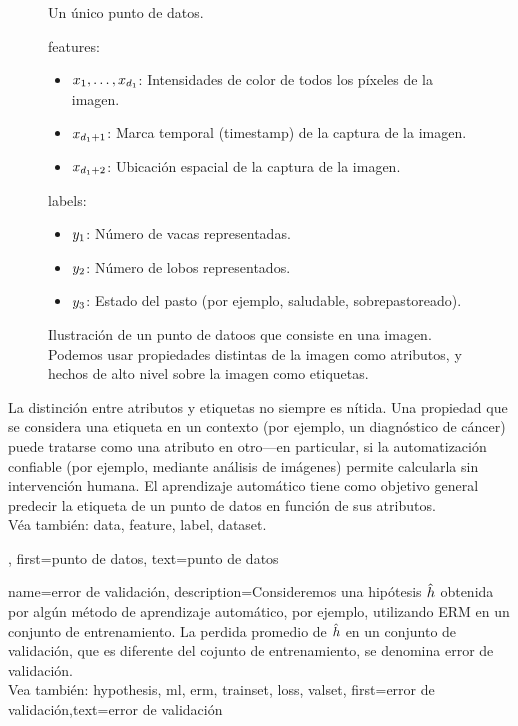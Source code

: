 {{\begin{figure}[H]
\begin{minipage}[t]{0.95\textwidth}
        			\caption*{Un único punto de datos.}
        			\vspace{5mm}
    			\end{minipage}
    			\begin{minipage}[t]{0.95\textwidth}
        			\Glspl{feature}:
        			\begin{itemize}
            			\item $x_{1},\ldots,x_{d_{1}}$: Intensidades de color de todos los píxeles de la imagen.
            			\item $x_{d_{1}+1}$: Marca temporal (timestamp) de la captura de la imagen.
            			\item $x_{d_{1}+2}$: Ubicación espacial de la captura de la imagen.
        			\end{itemize}
        			\Glspl{label}:
        			\begin{itemize}
            			\item $y_{1}$: Número de vacas representadas.
            			\item $y_{2}$: Número de lobos representados.
            			\item $y_{3}$: Estado del pasto (por ejemplo, saludable, sobrepastoreado).
        			\end{itemize}
    			\end{minipage}
    			\caption{Ilustración de un punto de datoos que consiste en una imagen. Podemos usar 
    			propiedades distintas de la imagen como atributos, y hechos de alto nivel 
    			sobre la imagen como etiquetas.\label{fig:datapoint_cowherd_dict}}
		\end{figure}
		La distinción entre atributos y etiquetas no siempre es nítida. 
		Una propiedad que se considera una etiqueta en un contexto (por ejemplo, un diagnóstico de cáncer) 
		puede tratarse como una atributo en otro—en particular, si la automatización confiable (por ejemplo, 
		mediante análisis de imágenes) permite calcularla sin intervención humana.
		El aprendizaje automático tiene como objetivo general predecir la etiqueta de un punto de datos
		en función de sus atributos.\\
		Véa también: \gls{data}, \gls{feature}, \gls{label}, \gls{dataset}.}, 
first={punto de datos},
text={punto de datos}  
}


{name={error de validación},
 description={Consideremos una hipótesis $\hat{h}$ obtenida por algún método de
 	aprendizaje automático, por ejemplo, utilizando ERM en un conjunto de entrenamiento. La perdida promedio de
 	$\hat{h}$ en un conjunto de validación, que es diferente del cojunto de entrenamiento, se denomina error de validación.
	 \\
	 Vea también: \gls{hypothesis}, \gls{ml}, \gls{erm}, \gls{trainset}, \gls{loss}, \gls{valset}},
	first={error de validación},text={error de validación}  
}

